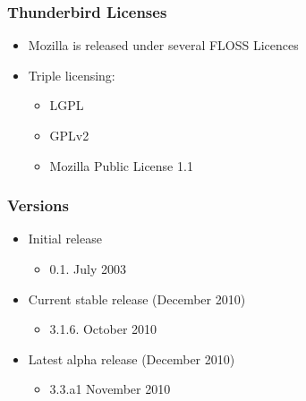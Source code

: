 \documentclass{beamer}
\begin{document}

\begin{frame}
 \frametitle{Thunderbird Licenses}
 \begin{itemize}
 \item Mozilla is released under several FLOSS Licences
 \item Triple licensing:
    \begin{itemize}
     \item LGPL
     \item GPLv2
     \item Mozilla Public License 1.1
    \end{itemize}

 \end{itemize}
\end{frame}


\begin{frame}
 \frametitle{Versions}
 \begin{itemize}
 \item Initial release
    \begin{itemize}
     \item 0.1. July 2003
    \end{itemize}

 \item Current stable release (December 2010)
    \begin{itemize}
     \item 3.1.6. October 2010
    \end{itemize}

 \item Latest alpha release (December 2010)
    \begin{itemize}
     \item 3.3.a1 November 2010
    \end{itemize}

 \end{itemize}
\end{frame}

\end{document}
